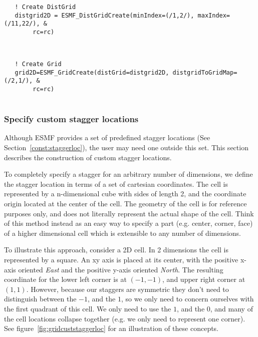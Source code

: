  \begin{verbatim}
   ! Create DistGrid
   distgrid2D = ESMF_DistGridCreate(minIndex=(/1,2/), maxIndex=(/11,22/), &
        rc=rc)
 
\end{verbatim}
 

 \begin{verbatim}

   ! Create Grid
   grid2D=ESMF_GridCreate(distGrid=distgrid2D, distgridToGridMap=(/2,1/), &
        rc=rc)
 
\end{verbatim}
 

  \subsubsection{Specify custom stagger locations}
  \label{sec:usage:staggerloc:adv}
  
   Although ESMF provides a set of predefined stagger locations (See Section~\ref{const:staggerloc}),
   the user may need one outside this set. This section describes the construction of
   custom stagger locations.
  
   To completely specify a stagger for an arbitrary number of dimensions, we define the
   stagger location in terms of a set of cartesian coordinates. The cell is represented
   by a n-dimensional cube with sides of length 2, and the coordinate origin located at
   the center of the cell. The geometry of the cell is for reference purposes only,
   and does not literally represent the actual shape of the cell. Think of this method
   instead as an easy way to specify a part (e.g. center, corner, face) of a higher
   dimensional cell which is extensible to any number of dimensions.
  
   To illustrate this approach, consider a 2D cell. In 2 dimensions
   the cell is represented by a square. An xy axis is placed at its center, with the
   positive x-axis oriented {\em East} and the positive y-axis oriented {\em North}.
   The resulting coordinate for the lower left corner is at $(-1,-1)$, and upper right
   corner at $(1,1)$.
   However, because our staggers are symmetric they don't need to distinguish between
   the $-1$, and the $1$, so we only need to concern ourselves with the first quadrant of
   this cell. We only need to use the $1$, and the $0$, and many of the cell locations
   collapse together (e.g. we only need to represent one corner). See figure~\ref{fig:gridcuststaggerloc}
   for an illustration of these concepts.
  
